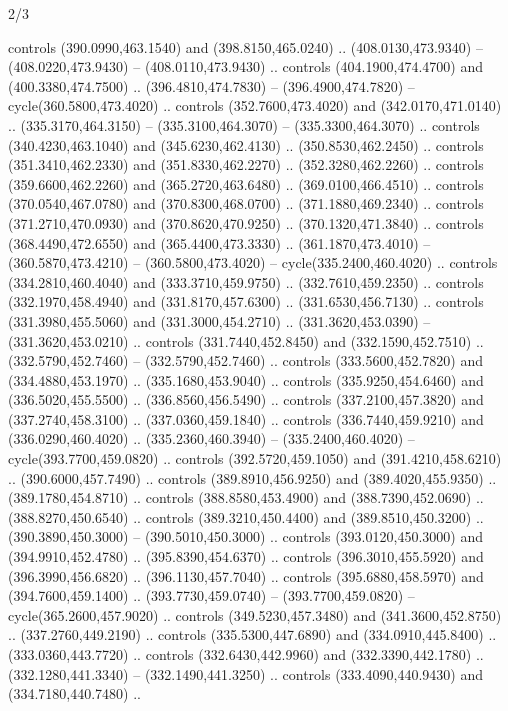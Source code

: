 \begin{flagdescription}{2/3}
\begin{scope}[xshift=0.5\flaglength]
\begin{scope}[scale=0.00209\flagwidth,yshift=170mm,xshift=-360]
\begin{scope}[y=-0.8pt, x=0.8pt, inner sep=0pt, outer sep=0pt]
\begin{scope}[cm={{-1.0,0.0,0.0,1.0,(900.0,0.0)}}]
  controls (390.0990,463.1540) and (398.8150,465.0240) .. (408.0130,473.9340) --
  (408.0220,473.9430) -- (408.0110,473.9430) .. controls (404.1900,474.4700) and
  (400.3380,474.7500) .. (396.4810,474.7830) -- (396.4900,474.7820) --
  cycle(360.5800,473.4020) .. controls (352.7600,473.4020) and
  (342.0170,471.0140) .. (335.3170,464.3150) -- (335.3100,464.3070) --
  (335.3300,464.3070) .. controls (340.4230,463.1040) and (345.6230,462.4130) ..
  (350.8530,462.2450) .. controls (351.3410,462.2330) and (351.8330,462.2270) ..
  (352.3280,462.2260) .. controls (359.6600,462.2260) and (365.2720,463.6480) ..
  (369.0100,466.4510) .. controls (370.0540,467.0780) and (370.8300,468.0700) ..
  (371.1880,469.2340) .. controls (371.2710,470.0930) and (370.8620,470.9250) ..
  (370.1320,471.3840) .. controls (368.4490,472.6550) and (365.4400,473.3330) ..
  (361.1870,473.4010) -- (360.5870,473.4210) -- (360.5800,473.4020) --
  cycle(335.2400,460.4020) .. controls (334.2810,460.4040) and
  (333.3710,459.9750) .. (332.7610,459.2350) .. controls (332.1970,458.4940) and
  (331.8170,457.6300) .. (331.6530,456.7130) .. controls (331.3980,455.5060) and
  (331.3000,454.2710) .. (331.3620,453.0390) -- (331.3620,453.0210) .. controls
  (331.7440,452.8450) and (332.1590,452.7510) .. (332.5790,452.7460) --
  (332.5790,452.7460) .. controls (333.5600,452.7820) and (334.4880,453.1970) ..
  (335.1680,453.9040) .. controls (335.9250,454.6460) and (336.5020,455.5500) ..
  (336.8560,456.5490) .. controls (337.2100,457.3820) and (337.2740,458.3100) ..
  (337.0360,459.1840) .. controls (336.7440,459.9210) and (336.0290,460.4020) ..
  (335.2360,460.3940) -- (335.2400,460.4020) -- cycle(393.7700,459.0820) ..
  controls (392.5720,459.1050) and (391.4210,458.6210) .. (390.6000,457.7490) ..
  controls (389.8910,456.9250) and (389.4020,455.9350) .. (389.1780,454.8710) ..
  controls (388.8580,453.4900) and (388.7390,452.0690) .. (388.8270,450.6540) ..
  controls (389.3210,450.4400) and (389.8510,450.3200) .. (390.3890,450.3000) --
  (390.5010,450.3000) .. controls (393.0120,450.3000) and (394.9910,452.4780) ..
  (395.8390,454.6370) .. controls (396.3010,455.5920) and (396.3990,456.6820) ..
  (396.1130,457.7040) .. controls (395.6880,458.5970) and (394.7600,459.1400) ..
  (393.7730,459.0740) -- (393.7700,459.0820) -- cycle(365.2600,457.9020) ..
  controls (349.5230,457.3480) and (341.3600,452.8750) .. (337.2760,449.2190) ..
  controls (335.5300,447.6890) and (334.0910,445.8400) .. (333.0360,443.7720) ..
  controls (332.6430,442.9960) and (332.3390,442.1780) .. (332.1280,441.3340) --
  (332.1490,441.3250) .. controls (333.4090,440.9430) and (334.7180,440.7480) ..

\end{scope}
\end{scope}
\end{scope}
\end{scope}
\end{flagdescription}
